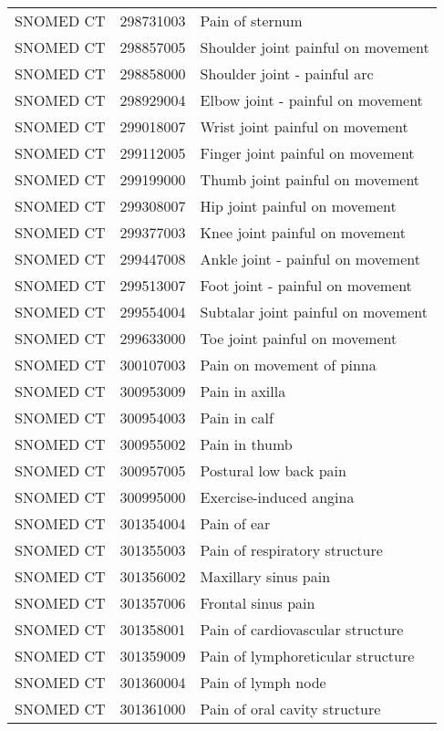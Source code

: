 \begin{longtable}{p{}p{}p{}}
  SNOMED CT & 298731003 & Pain of sternum \\ 
  SNOMED CT & 298857005 & Shoulder joint painful on movement \\ 
  SNOMED CT & 298858000 & Shoulder joint - painful arc \\ 
  SNOMED CT & 298929004 & Elbow joint - painful on movement \\ 
  SNOMED CT & 299018007 & Wrist joint painful on movement \\ 
  SNOMED CT & 299112005 & Finger joint painful on movement \\ 
  SNOMED CT & 299199000 & Thumb joint painful on movement \\ 
  SNOMED CT & 299308007 & Hip joint painful on movement \\ 
  SNOMED CT & 299377003 & Knee joint painful on movement \\ 
  SNOMED CT & 299447008 & Ankle joint - painful on movement \\ 
  SNOMED CT & 299513007 & Foot joint - painful on movement \\ 
  SNOMED CT & 299554004 & Subtalar joint painful on movement \\ 
  SNOMED CT & 299633000 & Toe joint painful on movement \\ 
  SNOMED CT & 300107003 & Pain on movement of pinna \\ 
  SNOMED CT & 300953009 & Pain in axilla \\ 
  SNOMED CT & 300954003 & Pain in calf \\ 
  SNOMED CT & 300955002 & Pain in thumb \\ 
  SNOMED CT & 300957005 & Postural low back pain \\ 
  SNOMED CT & 300995000 & Exercise-induced angina \\ 
  SNOMED CT & 301354004 & Pain of ear \\ 
  SNOMED CT & 301355003 & Pain of respiratory structure \\ 
  SNOMED CT & 301356002 & Maxillary sinus pain \\ 
  SNOMED CT & 301357006 & Frontal sinus pain \\ 
  SNOMED CT & 301358001 & Pain of cardiovascular structure \\ 
  SNOMED CT & 301359009 & Pain of lymphoreticular structure \\ 
  SNOMED CT & 301360004 & Pain of lymph node \\ 
  SNOMED CT & 301361000 & Pain of oral cavity structure \\ 

\end{longtable}
